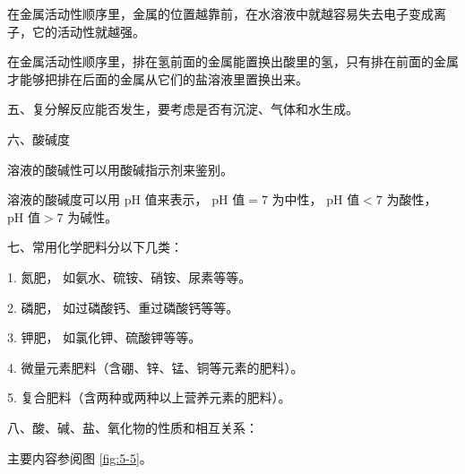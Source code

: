在金属活动性顺序里，金属的位置越靠前，在水溶液中就越容易失去电子变成离子，它的活动性就越强。

在金属活动性顺序里，排在氢前面的金属能置换出酸里的氢，只有排在前面的金属才能够把排在后面的金属从它们的盐溶液里置换出来。


五、复分解反应能否发生，要考虑是否有沉淀、气体和水生成。


六、酸碱度

溶液的酸碱性可以用酸碱指示剂来鉴别。

溶液的酸碱度可以用 pH 值来表示，
$\text{pH 值} = 7$ 为中性，
$\text{pH 值} < 7$ 为酸性，
$\text{pH 值} > 7$ 为碱性。


七、常用化学肥料分以下几类：

1. 氮肥， 如氨水、硫铵、硝铵、尿素等等。

2. 磷肥， 如过磷酸钙、重过磷酸钙等等。

3. 钾肥， 如氯化钾、硫酸钾等等。

4. 微量元素肥料（含硼、锌、锰、铜等元素的肥料）。

5. 复合肥料（含两种或两种以上营养元素的肥料）。


八、酸、碱、盐、氧化物的性质和相互关系：

主要内容参阅图 \ref{fig:5-5}。

